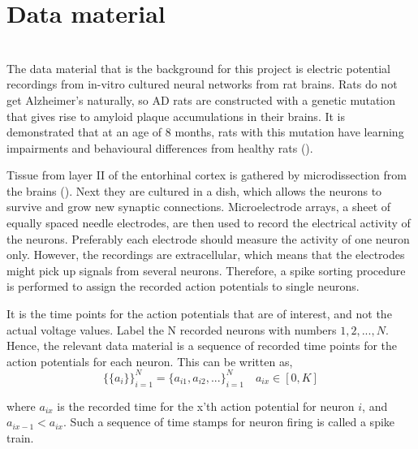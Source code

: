 \section{Data material}

\label{Lab}\\
The data material that is the background for this project is electric potential recordings from in-vitro cultured neural networks from rat brains. Rats do not get Alzheimer's naturally, so AD rats are constructed with a genetic mutation that gives rise to amyloid plaque accumulations in their brains. It is demonstrated that at an age of 8 months, rats with this mutation have learning impairments and behavioural differences from healthy rats (\cite{Radde}). 

Tissue from layer II of the entorhinal cortex is gathered by microdissection from the brains (\cite{Katrine}). Next they are cultured in a dish, which allows the neurons to survive and grow new synaptic connections. Microelectrode arrays, a sheet of equally spaced needle electrodes, are then used to record the electrical activity of the neurons. Preferably each electrode should measure the activity of one neuron only. However, the recordings are extracellular, which means that the electrodes might pick up signals from several neurons. Therefore, a spike sorting procedure is performed to assign the recorded action potentials to single neurons. 

It is the time points for the action potentials that are of interest, and not the actual voltage values. Label the N recorded neurons with numbers $1,2,...,N$. Hence, the relevant data material is a sequence of recorded time points for the action potentials for each neuron. This can be written as, 
\begin{equation}
\label{eq:AP}
    \{\{a_i\}\}_{i=1}^{N} = \{a_{i1}, a_{i2}, ...\}_{i=1}^{N} \quad a_{ix} \in [0,K]
\end{equation}

where $a_{ix}$ is the recorded time for the x'th action potential for neuron $i$, and $a_{ix-1} < a_{ix}$. Such a sequence of time stamps for neuron firing is called a spike train.\\






\cleardoublepage